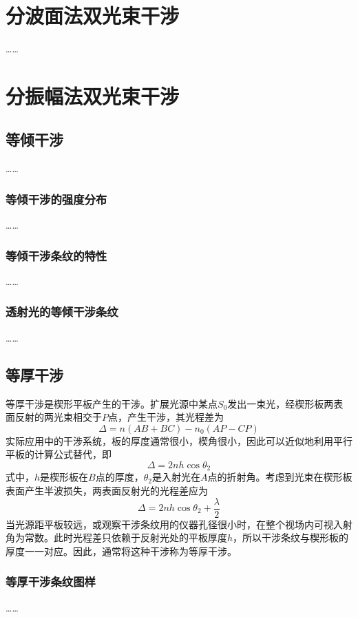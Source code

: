 \documentclass[cn,10pt,chinesefont=founder,math=mtpro2,cite=super,toc=onecol,twoside,openany]{elegantbook}
\begin{document}
\section{分波面法双光束干涉}
……

\section{分振幅法双光束干涉}
\subsection{等倾干涉}
……
\subsubsection{等倾干涉的强度分布}
……
\subsubsection{等倾干涉条纹的特性}
……
\subsubsection{透射光的等倾干涉条纹}
……

\subsection{等厚干涉}
等厚干涉是楔形平板产生的干涉。扩展光源中某点$S_0$发出一束光，经楔形板两表面反射的两光束相交于$P$点，产生干涉，其光程差为
\begin{equation}
\varDelta=n(AB+BC)-n_0(AP-CP)
\end{equation}
实际应用中的干涉系统，板的厚度通常很小，楔角很小，因此可以近似地利用平行平板的计算公式替代，即
\begin{equation}
\varDelta=2nh\cos\theta_2
\end{equation}
式中，$h$是楔形板在$B$点的厚度，$\theta_2$是入射光在$A$点的折射角。考虑到光束在楔形板表面产生半波损失，两表面反射光的光程差应为
\begin{equation}
\varDelta=2nh\cos\theta_2+\frac{\lambda}{2}
\end{equation}
当光源距平板较远，或观察干涉条纹用的仪器孔径很小时，在整个视场内可视入射角为常数。此时光程差只依赖于反射光处的平板厚度$h$，所以干涉条纹与楔形板的厚度一一对应。因此，通常将这种干涉称为等厚干涉。

\subsubsection{等厚干涉条纹图样}
……
\end{document}
